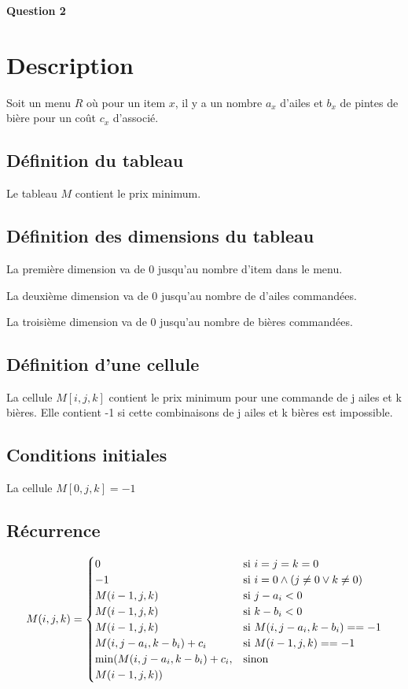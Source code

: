 \documentclass[class=article]{standalone}
\begin{document}
\centerline{\Huge \bf Question 2}
\bigskip

\section*{Description}

Soit un menu $R$ où pour un item $x$, il y a un nombre $a_x$ d'ailes 
et $b_x$ de pintes de bière pour un coût $c_x$ d'associé.

\subsection*{Définition du tableau}

Le tableau $M$ contient le prix minimum.

\subsection*{Définition des dimensions du tableau}

La première dimension va de 0 jusqu'au nombre d'item dans le menu.

La deuxième dimension va de 0 jusqu'au nombre de d'ailes commandées.

La troisième dimension va de 0 jusqu'au nombre de bières commandées.

\subsection*{Définition d'une cellule}

La cellule $M[i,j,k]$ contient le prix minimum pour une commande de j ailes et k bières.
Elle contient -1 si cette combinaisons de j ailes et k bières est impossible.


\subsection*{Conditions initiales}

La cellule $M[0, j, k] = -1$

\subsection*{Récurrence}

\[
    M(i, j, k) =
    \begin{cases}
        0 & \text{si } i = j = k = 0 \\
        -1 & \text{si } i = 0 \wedge \left ( j \neq 0 \vee k \neq 0 \right ) \\
        M(i-1, j, k) & \text{si } j-a_i < 0 \\
        M(i-1, j, k) & \text{si } k-b_i < 0 \\
        M(i-1, j, k) & \text{si } M(i, j-a_i, k-b_i) == -1 \\
        M(i, j-a_i, k-b_i) + c_i & \text{si } M(i-1, j, k) == -1 \\
        \min(M(i, j-a_i, k-b_i) + c_i,& \text{sinon }    \\
            M(i-1, j, k))
    \end{cases}
\]
\end{document}
